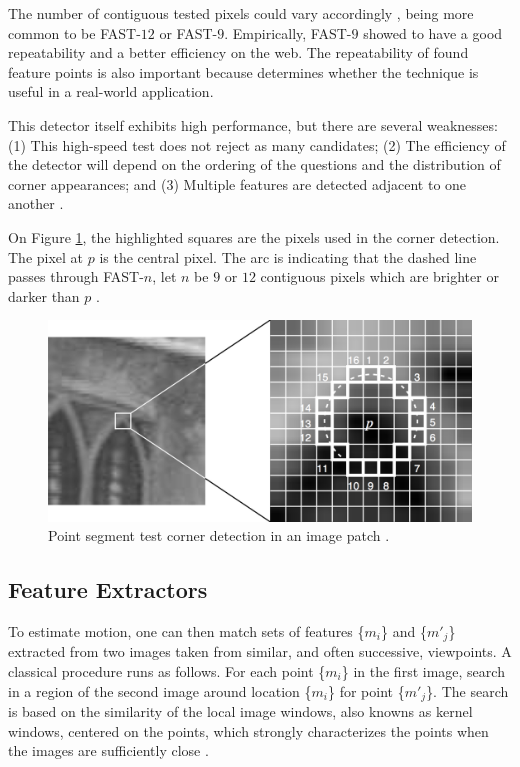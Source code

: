 The number of contiguous tested pixels could vary accordingly \cite{Rosten2010}, being more common to be FAST-$12$ or FAST-$9$. Empirically, FAST-$9$ showed to have a good repeatability and a better efficiency on the web. The repeatability of found feature points is also important because determines whether the technique is useful in a real-world application.

This detector itself exhibits high performance, but there are several weaknesses: (1) This high-speed test does not reject as many candidates; (2) The efficiency of the detector will depend on the ordering of the questions and the distribution of corner appearances; and (3) Multiple features are detected adjacent to one another \cite{Rosten2010}.

On Figure \ref{figure:fast}, the highlighted squares are the pixels used in the corner detection. The pixel at $p$ is the central pixel. The arc is indicating that the dashed line passes through FAST-$n$, let $n$ be $9$ or $12$ contiguous pixels which are brighter or darker than $p$ \cite{Rosten2010}.

\begin{figure}[!htb]
  \centering
  \includegraphics[width=380pt]{chapters/tracking_library_for_the_web/fast.png}
  \caption{Point segment test corner detection in an image patch \cite{Glass2013}.}
  \label{figure:fast}
\end{figure}


\subsection{Feature Extractors} %
\label{sub:tracking_library_for_the_web:marker_less_tracking_algorithm:feature_extractors}

To estimate motion, one can then match sets of features \{$m_{i}$\} and \{$m'_{j}$\} extracted from two images taken from similar, and often successive, viewpoints. A classical procedure \cite{Calonder2010} runs as follows. For each point \{$m_{i}$\} in the first image, search in a region of the second image around location \{$m_{i}$\} for point \{$m'_{j}$\}. The search is based on the similarity of the local image windows, also knowns as kernel windows, centered on the points, which strongly characterizes the points when the images are sufficiently close \cite{Lepetit2005}.


